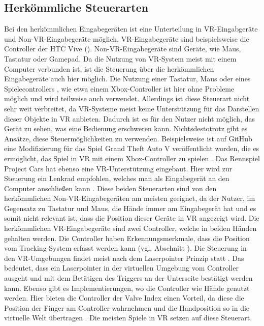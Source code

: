 \subsection{Herkömmliche Steuerarten}
Bei den herkömmlichen Eingabegeräten ist eine Unterteilung in VR-Eingabgeräte und Non-VR-Eingabegeräte möglich. VR-Eingabegeräte sind beispielsweise die Controller der HTC Vive (). Non-VR-Eingabegeräte sind Geräte, wie Maus, Tastatur oder Gamepad.
Da die Nutzung von  VR-System meist mit einem Computer verbunden ist, ist die Steuerung über die herkömmlichen Eingabegeräte auch hier möglich. Die Nutzung einer Tastatur, Maus oder eines Spielecontrollers , wie etwa einem Xbox-Controller ist hier ohne Probleme möglich und wird teilweise auch verwendet. Allerdings ist diese Steuerart nicht sehr weit verbreitet, da VR-Systeme meist keine Unterstützung für das Darstellen dieser Objekte in VR anbieten. Dadurch ist es für den Nutzer nicht möglich, das Gerät zu sehen, was eine Bedienung erschweren kann. Nichtsdestotrotz gibt es Ansätze, diese Steuermöglichkeiten zu verwenden. Beispielsweise ist auf GitHub eine Modifizierung für das Spiel Grand Theft Auto V veröffentlicht worden, die es ermöglicht, das Spiel in VR mit einem Xbox-Controller zu spielen \cite{Werner.2020}. Das Rennspiel Project Cars hat ebenso eine VR-Unterstützung eingebaut. Hier wird zur Steuerung ein Lenkrad empfohlen, welches man als Eingabegerät an den Computer anschließen kann \cite{projCars}. Diese beiden Steuerarten sind von den herkömmlichen Non-VR-Eingabegeräten am meisten geeignet, da der Nutzer, im Gegensatz zu Tastatur und Maus, die Hände immer am Eingabegerät hat und es somit nicht relevant ist, dass die Position dieser Geräte in VR angezeigt wird. 
Die herkömmlichen VR-Eingabegeräte sind zwei Controller, welche in beiden Händen gehalten werden. Die Controller haben Erkennungsmerkmale, dass die Position vom Tracking-System erfasst werden kann (vgl. Abschnitt ). Die Steuerung in den VR-Umgebungen findet meist nach dem Laserpointer Prinzip statt . Das bedeutet, dass ein Laserpointer in der virtuellen Umgebung vom Controller ausgeht und mit dem Betätigen des Triggers an der Unterseite bestätigt werden kann. Ebenso gibt es Implementierungen, wo die Controller wie Hände genutzt werden. Hier bieten die Controller der Valve Index einen Vorteil, da diese die Position der Finger am Controller wahrnehmen und die Handposition so in die virtuelle Welt übertragen \cite{Index.Controller}. Die meisten Spiele in VR setzen auf diese Steuerart.

